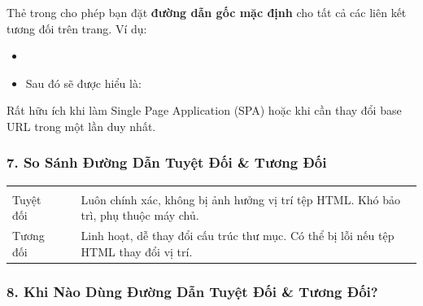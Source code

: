 \begin{noteBox}
Thẻ  trong  cho phép bạn đặt \textbf{đường dẫn gốc mặc định} cho tất cả các liên kết tương đối trên trang. Ví dụ:
\begin{itemize}[leftmargin=1.5em, itemsep=1pt, parsep=0pt]
\sloppy
    \item {}
    \item Sau đó  sẽ được hiểu là:\\
\end{itemize}
\fussy
Rất hữu ích khi làm Single Page Application (SPA) hoặc khi cần thay đổi base URL trong một lần duy nhất.
\end{noteBox}

\subsubsection{7. So Sánh Đường Dẫn Tuyệt Đối \& Tương Đối}

\begin{prettyTableBox}
\begin{tabularx}{\linewidth}{L{3.5cm} L{4cm} Z}
 &  &  \\
Tuyệt đối &  & Luôn chính xác, không bị ảnh hưởng vị trí tệp HTML. Khó bảo trì, phụ thuộc máy chủ. \\
Tương đối &  & Linh hoạt, dễ thay đổi cấu trúc thư mục. Có thể bị lỗi nếu tệp HTML thay đổi vị trí. \\
\end{tabularx}
\end{prettyTableBox}

\subsubsection{8. Khi Nào Dùng Đường Dẫn Tuyệt Đối \& Tương Đối?}

